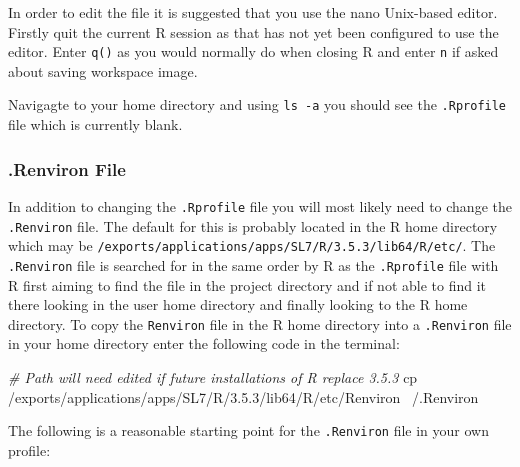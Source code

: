 \documentclass[
]{book}
\newenvironment{Shaded}{\begin{snugshade}}{\end{snugshade}}
\newcommand{\CommentTok}[1]{\textcolor[rgb]{0.56,0.35,0.01}{\textit{#1}}}
\newcommand{\FunctionTok}[1]{\textcolor[rgb]{0.00,0.00,0.00}{#1}}
\newcommand{\NormalTok}[1]{#1}
\begin{document}
In order to edit the file it is suggested that you use the nano Unix-based editor. Firstly quit the current R session as that has not yet been configured to use the editor. Enter \texttt{q()} as you would normally do when closing R and enter \texttt{n} if asked about saving workspace image.

Navigagte to your home directory and using \texttt{ls\ -a} you should see the \texttt{.Rprofile} file which is currently blank.

\hypertarget{renviron-file}{%
\subsubsection{.Renviron File}\label{renviron-file}}

In addition to changing the \texttt{.Rprofile} file you will most likely need to change the \texttt{.Renviron} file. The default for this is probably located in the R home directory which may be \texttt{/exports/applications/apps/SL7/R/3.5.3/lib64/R/etc/}. The \texttt{.Renviron} file is searched for in the same order by R as the \texttt{.Rprofile} file with R first aiming to find the file in the project directory and if not able to find it there looking in the user home directory and finally looking to the R home directory. To copy the \texttt{Renviron} file in the R home directory into a \texttt{.Renviron} file in your home directory enter the following code in the terminal:

\begin{Shaded}
\begin{Highlighting}[]
\CommentTok{# Path will need edited if future installations of R replace 3.5.3}
\FunctionTok{cp}\NormalTok{ /exports/applications/apps/SL7/R/3.5.3/lib64/R/etc/Renviron ~/.Renviron}
\end{Highlighting}
\end{Shaded}

The following is a reasonable starting point for the \texttt{.Renviron} file in your own profile:
\end{document}
